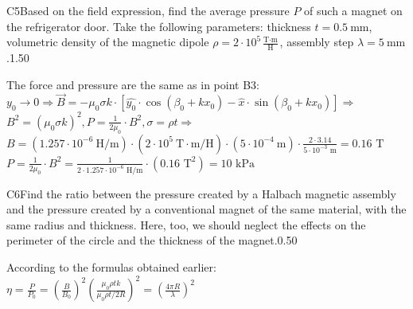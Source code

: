 \documentclass[11pt,a4paper]{article}
\begin{document}
\begin{solcard}{C5}{Based on the field expression, find the average pressure $P$ of such a magnet on the refrigerator door. Take the following parameters: thickness $t=0.5~\text{mm}$, volumetric density of the magnetic dipole $\rho = 2 \cdot 10^5 \frac {\text{T} \cdot \text{m}} {\text{H}}$, assembly step $\lambda=5~\text{mm}$.}{1.50}

The force and pressure are the same as in point B3: $y_0 \rightarrow 0 \Rightarrow \vec B = -\mu_0\sigma k \cdot[\hat{y_0}\cdot\cos(\beta_0+kx_0) -\hat{x}\cdot\sin(\beta_0+kx_0)] \Rightarrow$ $B^2=(\mu_0\sigma k)^2, P=\frac{1}{2\mu_0}\cdot B^2, \sigma=\rho t \Rightarrow$ $B=(1.257\cdot 10^{-6}~\text{H/m}) \cdot(2\cdot 10^5~ \text{T}\cdot\text{m}/\text{H}) \cdot(5\cdot10^{-4}~\text{m}) \cdot \frac{2\cdot 3.14}{5\cdot 10^{-3}\text{ m}} =0.16 \text{ T}$ $P=\frac{1}{2\mu_0}\cdot B^2=\frac{1} {2\cdot 1.257 \cdot 10^{-6} \text{ H/m}} \cdot (0.16\text{ T}^2)=10\text{ kPa}$

\end{solcard}

\begin{solcard}{C6}{Find the ratio between the pressure created by a Halbach magnetic assembly and the pressure created by a conventional magnet of the same material, with the same radius and thickness. Here, too, we should neglect the effects on the perimeter of the circle and the thickness of the magnet.}{0.50}

According to the formulas obtained earlier: $\eta=\frac{P}{P_0}=(\frac{B}{B_0})^2 (\frac{\mu_0\rho tk}{\mu_0\rho t/2R})^2= (\frac{4\pi R}{\lambda})^2$

\end{solcard}
\end{document}
